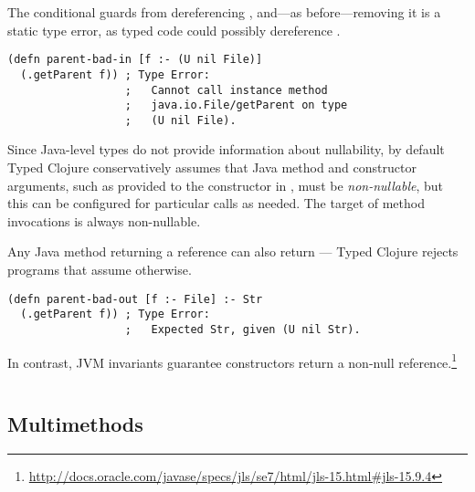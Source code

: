 The conditional guards from dereferencing , and---as before---removing 
it is a static type error, as typed code could possibly dereference .
\begin{verbatim}
(defn parent-bad-in [f :- (U nil File)]
  (.getParent f)) ; Type Error:
                  ;   Cannot call instance method 
                  ;   java.io.File/getParent on type 
                  ;   (U nil File).
\end{verbatim}
Since Java-level types do not provide information about nullability,
by default Typed Clojure conservatively assumes that Java method and
constructor arguments, such as  provided to the  constructor in
,
 must be \emph{non-nullable}, but this can be
configured for  particular calls as needed.
The target of method invocations is always non-nullable.

Any Java method returning a reference can also return  ---
Typed Clojure rejects programs that assume otherwise.

\begin{verbatim}
(defn parent-bad-out [f :- File] :- Str
  (.getParent f)) ; Type Error:
                  ;   Expected Str, given (U nil Str).
\end{verbatim}

%

In contrast, JVM invariants guarantee constructors return a non-null reference.\footnote{\url{http://docs.oracle.com/javase/specs/jls/se7/html/jls-15.html#jls-15.9.4}}

\begin{exmp}
\inputminted[firstline=15,lastline=16]{clojure}{code/demo/src/demo/parent3.clj}
\end{exmp}


\subsection{Multimethods}

\label{sec:multioverview}

